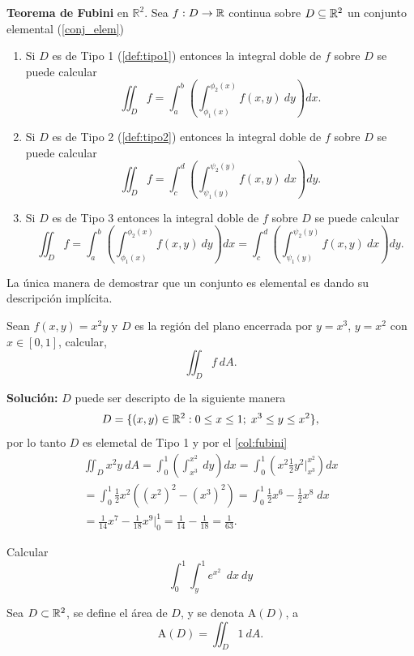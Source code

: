 
\begin{theorem}  \label{col:fubini} \textbf{Teorema de Fubini} en $\mathbb{R}^{2}.$  Sea $f:D\to\mathbb{R}$ continua sobre  $D\subseteq\mathbb{R}^2$  un conjunto elemental   (\ref{conj_elem}) 
   
\begin{enumerate} 
        \item  Si $D$ es de Tipo 1 (\ref{def:tipo1})   entonces la integral doble de $f$ sobre $D$ se puede calcular
        \[
            \iint_D f=\int_a^b\left(\int_{\phi_1(x)}^{\phi_2(x)}f(x,y)\:dy\right)dx.  
        \]
       
        \item   Si $D$ es de Tipo 2 (\ref{def:tipo2})  entonces la integral doble de $f$ sobre $D$ se puede calcular
        \[
            \iint_D f=\int_c^d\left(\int_{\psi_1(y)}^{\psi_2(y)}f(x,y)\:dx\right)dy.  
        \]
       
        \item Si $D$ es de Tipo 3   entonces la integral doble de $f$ sobre $D$ se puede calcular  
         \[
            \iint_D f=\int_a^b\left(\int_{\phi_1(x)}^{\phi_2(x)}f(x,y)\:dy\right)dx=\int_c^d\left(\int_{\psi_1(y)}^{\psi_2(y)}f(x,y)\:dx\right)dy. 
        \]
    \end{enumerate}
\end{theorem}


\begin{obs} La \'unica manera de demostrar que un conjunto es elemental es dando su descripci\'on  impl\'icita.
\end{obs}


\begin{example}
     Sean $f(x,y)=x^2y$ y  $D$ es la regi\'on del plano encerrada por $y=x^3$, $y=x^2$  con $x\in[0,1]$,  calcular,  $$\iint_D f \:dA.$$  
\end{example}

\begin{figure}[htbp]
    \centering
     
    \label{fig:ejemplo 812}
\end{figure}

\textbf{Soluci\'on:} $D$ puede ser descripto de la siguiente manera
    \[
        D=\{(x,y)\in\mathbb{R}^2:0\leq x\leq1;\;x^3\leq y\leq x^2\},  
    \]
 por lo tanto $D$ es elemetal de Tipo 1 y  por el \autoref{col:fubini}
    \begin{gather*}
        \iint_D x^2y\:dA=\int_0^1\left(\int_{x^3}^{x^2}\:dy\right)dx=\int_0^1\left(x^2\frac{1}{2}y^2\Big\lvert_{x^3}^{x^2}\right)dx\\
        =\int_0^1\frac{1}{2}x^2\left((x^2)^2-(x^3)^2\right)=\int_0^1\frac{1}{2}x^6-\frac{1}{2}x^8\;dx\\=\frac{1}{14}x^7-\frac{1}{18}x^9\Big\lvert_0^1=\frac{1}{14}-\frac{1}{18}=\frac{1}{63}.
    \end{gather*}


\begin{tarea}Calcular  $$ \int_{0}^{1}\int_{y}^{1} e^{x^{2}} \:\: dx\:dy $$
\end{tarea}



\begin{definition}  
    \label{def:area}
    Sea $D\subset\mathbb{R}^2$,  se define el \'area de $D$,  y se denota $\text{A}(D)$,  a  
    \[
        \text{A}(D)=\iint_D1\:dA.
    \]
\end{definition}
